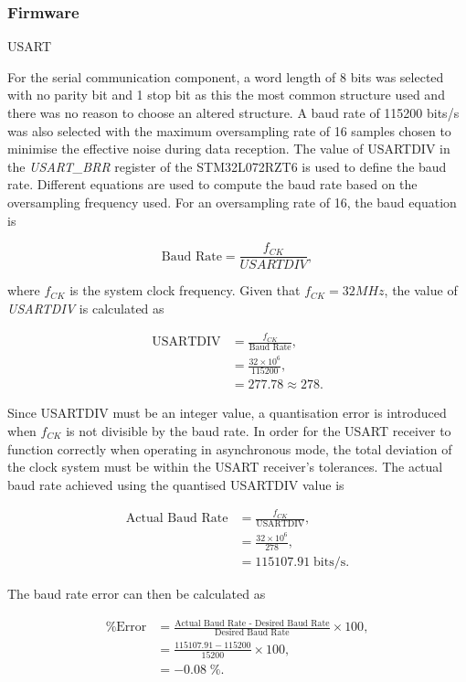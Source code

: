 \subsubsection{Firmware}

USART

For the serial communication component, a word length of 8 bits was selected with no parity bit and 1 stop bit as this the most common structure used and there was no reason to choose an altered structure. A baud rate of 115200 bits/s was also selected with the maximum oversampling rate of 16 samples chosen to minimise the effective noise during data reception. The value of USARTDIV in the \textit{USART\_BRR} register of the STM32L072RZT6 is used to define the baud rate. Different equations are used to compute the baud rate based on the oversampling frequency used. For an oversampling rate of 16, the baud equation is

\begin{equation}
	\text{Baud Rate}=\frac{f_{CK}}{\textit{USARTDIV}},
\end{equation}

where $f_{CK}$ is the system clock frequency. Given that $f_{CK}=32MHz$, the value of \textit{USARTDIV} is calculated as 

\begin{align}
	\text{USARTDIV}&=\frac{f_{CK}}{\text{Baud Rate}},\\
	&=\frac{32\times10^6}{115200},\\
	&=277.78\approx278.
\end{align} 

Since USARTDIV must be an integer value, a quantisation error is introduced when $f_{CK}$ is not divisible by
the baud rate. In order for the USART receiver to function correctly when operating in asynchronous mode, the total deviation of the clock system must be within the USART receiver's tolerances. The actual baud rate achieved using the quantised USARTDIV value is 

\begin{align}
	\text{Actual Baud Rate}&=\frac{f_{CK}}{\text{USARTDIV}},\\
	&=\frac{32\times10^6}{278},\\
	&=115107.91\;\text{bits/s}.
\end{align}

The baud rate error can then be calculated as

\begin{align}
	\text{\% Error}&=\frac{\text{Actual Baud Rate - Desired Baud Rate}}{\text{Desired Baud Rate}} \times 100,\\
	&=\frac{115107.91-115200}{15200} \times 100,\\
	&=-0.08\;\text{\%}.
\end{align}

